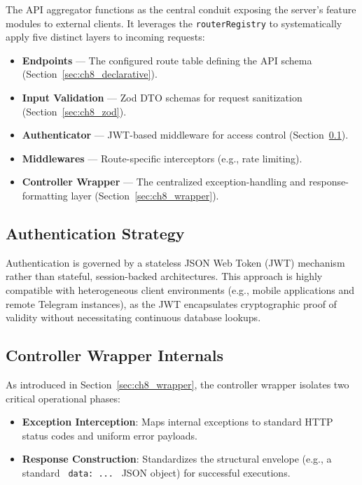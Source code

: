 The API aggregator functions as the central conduit exposing the server's feature modules to external clients. It leverages the \texttt{routerRegistry} to systematically apply five distinct layers to incoming requests:

\begin{itemize}
    \item \textbf{Endpoints} — The configured route table defining the API schema (Section~\ref{sec:ch8_declarative}).
    \item \textbf{Input Validation} — Zod DTO schemas for request sanitization (Section~\ref{sec:ch8_zod}).
    \item \textbf{Authenticator} — JWT-based middleware for access control (Section~\ref{sec:ch8_auth}).
    \item \textbf{Middlewares} — Route-specific interceptors (e.g., rate limiting).
    \item \textbf{Controller Wrapper} — The centralized exception-handling and response-formatting layer (Section~\ref{sec:ch8_wrapper}).
\end{itemize}

\subsection{Authentication Strategy}
\label{sec:ch8_auth}

Authentication is governed by a stateless JSON Web Token (JWT) mechanism rather than stateful, session-backed architectures. This approach is highly compatible with heterogeneous client environments (e.g., mobile applications and remote Telegram instances), as the JWT encapsulates cryptographic proof of validity without necessitating continuous database lookups.


\subsection{Controller Wrapper Internals}
\label{sec:ch8_wrapper_internals}

As introduced in Section~\ref{sec:ch8_wrapper}, the controller wrapper isolates two critical operational phases:

\begin{itemize}
    \item \textbf{Exception Interception}: Maps internal exceptions to standard HTTP status codes and uniform error payloads.
    \item \textbf{Response Construction}: Standardizes the structural envelope (e.g., a standard \texttt{{ data: ... }} JSON object) for successful executions.
\end{itemize}


